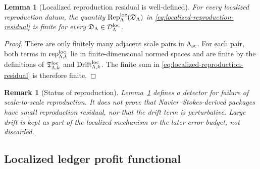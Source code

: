 \documentclass[11pt]{article}
\numberwithin{equation}{section}
\newtheorem{lemma}[theorem]{Lemma}
\newtheorem{remark}[theorem]{Remark}
\begin{document}
\begin{lemma}[Localized reproduction residual is well-defined]\label{lem:localized-reproduction-residual}
For every localized reproduction datum, the quantity
\(\operatorname{Rep}_\Lambda^{\rm loc}(\mathfrak D_\Lambda)\) in
\eqref{eq:localized-reproduction-residual} is finite for every
\(\mathfrak D_\Lambda\in\mathcal D_\Lambda^{\rm loc}\).
\end{lemma}

\begin{proof}
There are only finitely many adjacent scale pairs in
\(\Lambda_{\rm sc}\).  For each pair, both terms in
\(\operatorname{rep}_{\Lambda,k}^{\rm loc}\) lie in finite-dimensional
normed spaces and are finite by the definitions of
\(\mathfrak T_{\Lambda,k}^{\rm loc}\) and
\(\operatorname{Drift}_{\Lambda,k}^{\rm loc}\).  The finite sum in
\eqref{eq:localized-reproduction-residual} is therefore finite.
\end{proof}

\begin{remark}[Status of reproduction]
Lemma~\ref{lem:localized-reproduction-residual} defines a detector for
failure of scale-to-scale reproduction.  It does not prove that
Navier--Stokes-derived packages have small reproduction residual, nor that
the drift term is perturbative.  Large drift is kept as part of the
localized mechanism or the later error budget, not discarded.
\end{remark}

\subsection{Localized ledger profit functional}\label{subsec:localized-ledger-profit}
\end{document}
